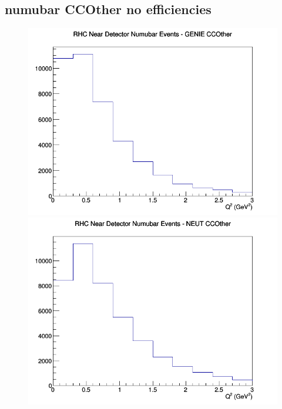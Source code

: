 \subsection{numubar CCOther no efficiencies}
\begin{figure}[h]
\includegraphics[width=\linewidth]{Q2/nominal/CCOther_RHC_ND_numubar_Q2_GENIE.png}
\endminipage
{}
\includegraphics[width=\linewidth]{Q2/nominal/CCOther_RHC_ND_numubar_Q2_NEUT.png}
\endminipage
{}

\end{figure}
